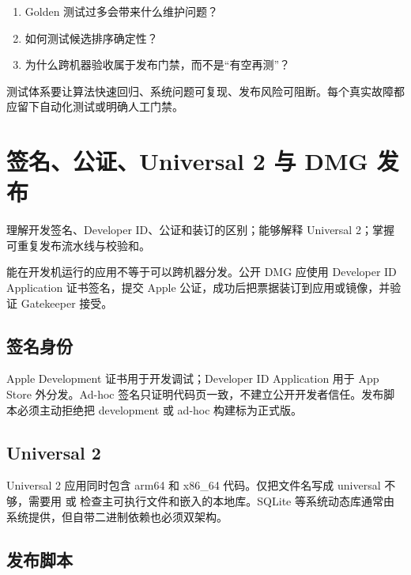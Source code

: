 \exercises
\begin{enumerate}
  \item Golden 测试过多会带来什么维护问题？
  \item 如何测试候选排序确定性？
  \item 为什么跨机器验收属于发布门禁，而不是“有空再测”？
\end{enumerate}

\begin{summarybox}
测试体系要让算法快速回归、系统问题可复现、发布风险可阻断。每个真实故障都应留下自动化测试或明确人工门禁。
\end{summarybox}


\chapter{签名、公证、Universal 2 与 DMG 发布}

\begin{goals}
理解开发签名、Developer ID、公证和装订的区别；能够解释 Universal 2；掌握可重复发布流水线与校验和。
\end{goals}

能在开发机运行的应用不等于可以跨机器分发。公开 DMG 应使用 Developer ID Application 证书签名，提交 Apple 公证，成功后把票据装订到应用或镜像，并验证 Gatekeeper 接受。


\section{签名身份}

Apple Development 证书用于开发调试；Developer ID Application 用于 App Store 外分发。Ad-hoc 签名只证明代码页一致，不建立公开开发者信任。发布脚本必须主动拒绝把 development 或 ad-hoc 构建标为正式版。

\section{Universal 2}

Universal 2 应用同时包含 arm64 和 x86\_64 代码。仅把文件名写成 universal 不够，需要用  或  检查主可执行文件和嵌入的本地库。SQLite 等系统动态库通常由系统提供，但自带二进制依赖也必须双架构。

\section{发布脚本}

